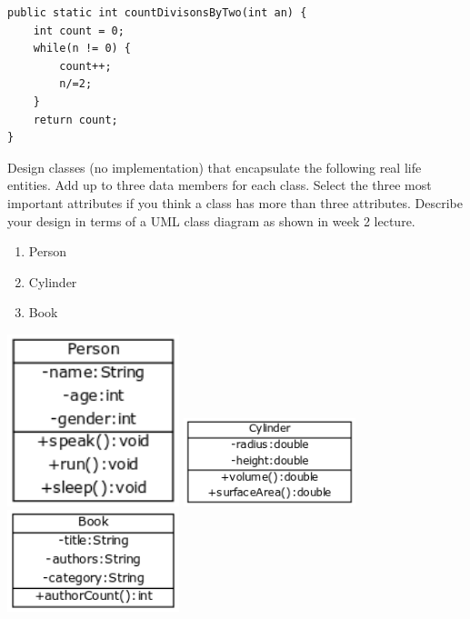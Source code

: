 \documentclass{exam}
\begin{document}
\begin{questions}
\begin{solution}
\begin{lstlisting}
public static int countDivisonsByTwo(int an) {
	int count = 0;
	while(n != 0) {
		count++;
		n/=2;
	}
	return count;
}
\end{lstlisting}
\end{solution}

\newpage

\question Design classes (no implementation) that encapsulate the following real life entities. Add up to three data members for each class. Select the three most important attributes if you think a class has more than three attributes. Describe your design in terms of a UML class diagram as shown in week 2 lecture.

\begin{enumerate}
\item Person
\item Cylinder
\item Book
\end{enumerate}

\begin{solution}
\includegraphics[width=5cm]{Person.png}
\vskip 0.5cm
\includegraphics[width=5cm]{Cylinder.png}
\vskip 0.5cm
\includegraphics[width=5cm]{Book.png}
\vskip 0.5cm
\end{solution}

\question 


\end{questions}
\end{document}
